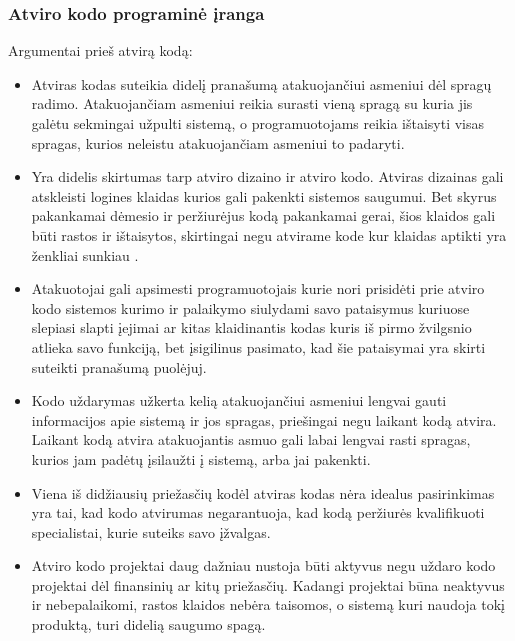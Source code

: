 \documentclass[a4paper,12pt,fleqn]{article}
\begin{document}
\subsubsection{Atviro kodo programinė įranga}
\label{sec:data}
Argumentai prieš atvirą kodą:
\begin{itemize}
	\item Atviras kodas suteikia didelį pranašumą atakuojančiui asmeniui dėl spragų radimo. Atakuojančiam asmeniui reikia surasti vieną spragą su kuria jis galėtu sekmingai užpulti sistemą, o programuotojams reikia ištaisyti visas spragas, kurios neleistu atakuojančiam asmeniui to padaryti\cite{brown2002opening}.
	\item Yra didelis skirtumas tarp atviro dizaino ir atviro kodo. Atviras dizainas gali atskleisti logines klaidas kurios gali pakenkti sistemos saugumui. Bet skyrus pakankamai dėmesio ir peržiurėjus kodą pakankamai gerai, šios klaidos gali būti rastos ir ištaisytos, skirtingai negu atvirame kode kur klaidas aptikti yra ženkliai sunkiau \cite{hoepman2008increased}.
	\item Atakuotojai gali apsimesti programuotojais kurie nori prisidėti prie atviro kodo sistemos kurimo ir palaikymo siulydami savo pataisymus kuriuose slepiasi slapti įejimai ar kitas klaidinantis kodas kuris iš pirmo žvilgsnio atlieka savo funkciją, bet įsigilinus pasimato, kad šie pataisymai yra skirti suteikti pranašumą puolėjuj\cite{951496}. 
	\item Kodo uždarymas užkerta kelią atakuojančiui asmeniui lengvai gauti informacijos apie sistemą ir jos spragas, priešingai negu laikant kodą atvira. Laikant kodą atvira atakuojantis asmuo gali labai lengvai rasti spragas, kurios jam padėtų įsilaužti į sistemą, arba jai pakenkti\cite{hoepman2008increased}. 
	\item Viena iš didžiausių priežasčių kodėl atviras kodas nėra idealus pasirinkimas yra tai, kad kodo atvirumas negarantuoja, kad kodą peržiurės kvalifikuoti specialistai, kurie suteiks savo įžvalgas\cite{951496}. 
	\item Atviro kodo projektai daug dažniau nustoja būti aktyvus negu uždaro kodo projektai dėl finansinių ar kitų priežasčių. Kadangi projektai būna neaktyvus ir nebepalaikomi, rastos klaidos nebėra taisomos, o sistemą kuri naudoja tokį produktą, turi didelią saugumo spagą\cite{951496}. 
\end{itemize}
\end{document}

